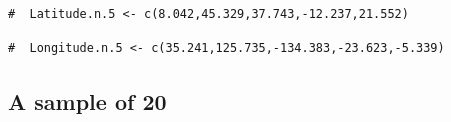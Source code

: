 \documentclass[letterpaper,12pt,twoside,]{pinp}
\begin{document}
\begin{Shaded}
\begin{Highlighting}[]
\StringTok{ }

\NormalTok{(}\NormalTok{(}\NormalTok{,}\NormalTok{,}
                \NormalTok{(}\OperatorTok{$}\NormalTok{lat[params}\OperatorTok{$}\NormalTok{ind5],}\NormalTok{),}
                      \NormalTok{),}\NormalTok{, }\NormalTok{ ))}
\end{Highlighting}
\end{Shaded}

\begin{ShadedResult}
\begin{verbatim}
#  Latitude.n.5 <- c(8.042,45.329,37.743,-12.237,21.552)
\end{verbatim}
\end{ShadedResult}

\begin{Shaded}
\begin{Highlighting}[]
\NormalTok{(}\NormalTok{(}\NormalTok{,}\NormalTok{,}
                \NormalTok{(}\OperatorTok{$}\NormalTok{lon[params}\OperatorTok{$}\NormalTok{ind5],}\NormalTok{),}
                      \NormalTok{),}\NormalTok{, }\NormalTok{ ))}
\end{Highlighting}
\end{Shaded}

\begin{ShadedResult}
\begin{verbatim}
#  Longitude.n.5 <- c(35.241,125.735,-134.383,-23.623,-5.339)
\end{verbatim}
\end{ShadedResult}

\hypertarget{a-sample-of-20}{%
\subsection*{A sample of 20}\label{a-sample-of-20}}
\end{document}
